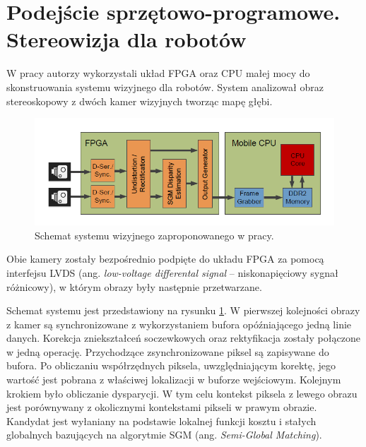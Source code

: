 
\section{Podejście sprzętowo-programowe. Stereowizja dla robotów }

W pracy \cite{honegger2014real} autorzy wykorzystali układ FPGA oraz CPU małej mocy do skonstruowania systemu wizyjnego dla robotów. 
System analizował obraz stereoskopowy z dwóch kamer wizyjnych tworząc mapę głębi. 
\begin{figure}[h]
    \centering
    \includegraphics[width=1\textwidth]{images/honegger2014real_Fig1}
    \caption{Schemat systemu wizyjnego zaproponowanego w pracy\cite{honegger2014real}.}
    \label{fig:honegger2014real_Fig1}
\end{figure}
Obie kamery zostały bezpośrednio podpięte do układu FPGA za pomocą interfejsu LVDS (ang. \textit{low-voltage differental signal} – niskonapięciowy sygnał różnicowy), w którym obrazy były następnie przetwarzane. 


Schemat systemu jest przedstawiony na rysunku \ref{fig:honegger2014real_Fig1}. W pierwszej kolejności obrazy z kamer są synchronizowane z wykorzystaniem bufora opóźniającego jedną linie danych. 
Korekcja zniekształceń soczewkowych oraz rektyfikacja zostały połączone w jedną operację. Przychodzące zsynchronizowane piksel są zapisywane do bufora. Po obliczaniu współrzędnych piksela, uwzględniającym korektę, jego wartość jest pobrana z właściwej lokalizacji w buforze wejściowym. Kolejnym krokiem było obliczanie dysparycji. W tym celu kontekst piksela z lewego obrazu jest porównywany z okolicznymi kontekstami pikseli w prawym obrazie. Kandydat jest wyłaniany na podstawie lokalnej funkcji kosztu i stałych globalnych bazujących na algorytmie SGM (ang. \textit{Semi-Global Matching}). 


